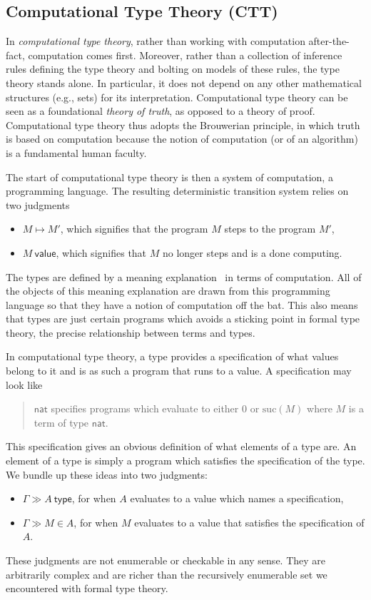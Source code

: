 \documentclass{article}
\newcommand{\hasTC}[2]{\ensuremath{#1 \gg #2\ \mathsf{type}}}
\newcommand{\hasEC}[3]{\ensuremath{#1 \gg #2 \in #3}}
\newcommand{\step}[2]{\ensuremath{#1 \mapsto #2}}
\newcommand{\valueJ}[1]{\ensuremath{#1\ \mathsf{value}}}
\newcommand{\nat}{\ensuremath{\mathsf{nat}}}
\begin{document}
\subsection{Computational Type Theory (CTT)}
In \emph{computational type theory}, rather than working with computation
after-the-fact, computation comes first. Moreover, rather than a collection
of inference rules defining the type theory and bolting on models of
these rules, the type theory stands alone.  In particular, it does not depend on any other
mathematical structures (e.g., sets) for its interpretation.  Computational type theory
can be seen as a foundational \emph{theory of truth}, as opposed to a theory of
proof.  Computational type theory thus adopts the Brouwerian principle, in which truth is based on
computation because the notion of computation (or of an algorithm) is a fundamental human faculty.

The start of computational type theory is then a system of
computation, a programming language.  The resulting deterministic transition system relies on two
judgments
\begin{itemize}
\item $\step{M}{M'}$, which signifies that the program $M$ steps to the
  program $M'$,
\item $\valueJ{M}$,  which signifies that $M$ no longer steps and is a
  done computing.
\end{itemize}
The types are defined by a meaning explanation~\citep{MartinLof:79} in
terms of computation. All of the objects of this meaning explanation
are drawn from this programming language so that they have a notion of
computation off the bat. This also means that types are just certain
programs which avoids a sticking point in formal type theory, the
precise relationship between terms and types.

In computational type theory, a type provides a specification of what values belong to it and
is as such a program that runs to a value.  %
A specification may look like
\begin{quote}
  $\nat$ specifies programs which evaluate to either $0$ or
  $\mathrm{suc}(M)$ where $M$ is a term of type $\nat$.
\end{quote}
This specification gives an obvious definition of what elements of a
type are. An element of a type is simply a program which satisfies the
specification of the type. We bundle up these ideas into two
judgments:
\begin{itemize}
\item $\hasTC{\Gamma}{A}$, for when $A$ evaluates to a value
  which names a specification,
\item $\hasEC{\Gamma}{M}{A}$, for when $M$ evaluates to a value that satisfies the
  specification of $A$.
\end{itemize}
These judgments are not enumerable or checkable in any sense. They are
arbitrarily complex and are richer than the recursively enumerable set
we encountered with formal type theory.
\end{document}
